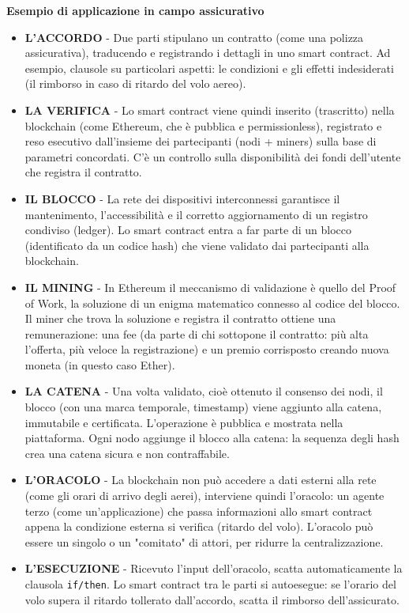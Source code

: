 \begin{mdframed}[backgroundcolor=gray!20,shadow=false]
\textbf{Esempio di applicazione in campo assicurativo}
\begin{itemize}
    \item \textbf{L'ACCORDO} - Due parti stipulano un contratto (come una polizza assicurativa), traducendo e registrando i dettagli in uno smart contract. Ad esempio, clausole su particolari aspetti: le condizioni e gli effetti indesiderati (il rimborso in caso di ritardo del volo aereo).
    \item \textbf{LA VERIFICA} - Lo smart contract viene quindi inserito (trascritto) nella blockchain (come Ethereum, che è pubblica e permissionless), registrato e reso esecutivo dall'insieme dei partecipanti (nodi + miners) sulla base di parametri concordati. C'è un controllo sulla disponibilità dei fondi dell'utente che registra il contratto.
    \item \textbf{IL BLOCCO} - La rete dei dispositivi interconnessi garantisce il mantenimento, l'accessibilità e il corretto aggiornamento di un registro condiviso (ledger). Lo smart contract entra a far parte di un blocco (identificato da un codice hash) che viene validato dai partecipanti alla blockchain.
    \item \textbf{IL MINING} - In Ethereum il meccanismo di validazione è quello del Proof of Work, la soluzione di un enigma matematico connesso al codice del blocco. Il miner che trova la soluzione e registra il contratto ottiene una remunerazione: una fee (da parte di chi sottopone il contratto: più alta l'offerta, più veloce la registrazione) e un premio corrisposto creando nuova moneta (in questo caso Ether).
    \item \textbf{LA CATENA} - Una volta validato, cioè ottenuto il consenso dei nodi, il blocco (con una marca temporale, timestamp) viene aggiunto alla catena, immutabile e certificata. L'operazione è pubblica e mostrata nella piattaforma. Ogni nodo aggiunge il blocco alla catena: la sequenza degli hash crea una catena sicura e non contraffabile.
    \item \textbf{L'ORACOLO} - La blockchain non può accedere a dati esterni alla rete (come gli orari di arrivo degli aerei), interviene quindi l'oracolo: un agente terzo (come un'applicazione) che passa informazioni allo smart contract appena la condizione esterna si verifica (ritardo del volo). L'oracolo può essere un singolo o un "comitato" di attori, per ridurre la centralizzazione.
    \item \textbf{L'ESECUZIONE} - Ricevuto l'input dell'oracolo, scatta automaticamente la clausola \texttt{if/then}. Lo smart contract tra le parti si autoesegue: se l'orario del volo supera il ritardo tollerato dall'accordo, scatta il rimborso dell'assicurato.
\end{itemize}
\end{mdframed}

